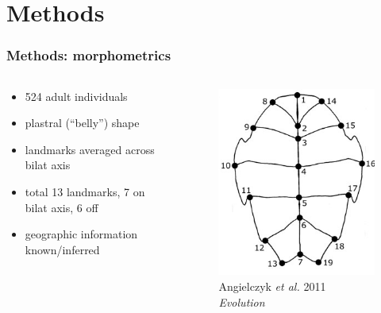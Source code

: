 \documentclass{beamer}\usepackage{graphicx, color}
\begin{document}
\section{Methods}
\begin{frame}
  \frametitle{Methods: morphometrics}
  \begin{columns}
    \begin{column}{0.5\textwidth}
      \begin{itemize}
        \item 524 adult individuals
        \item plastral (``belly'') shape
        \item landmarks averaged across bilat axis
        \item total 13 landmarks, 7 on bilat axis, 6 off
        \item geographic information known/inferred
      \end{itemize}
    \end{column}
    \begin{column}{0.5\textwidth}
      \begin{figure}[h]
        \centering
        \captionsetup{justification = raggedleft, slc = off}
        \includegraphics[width = \textwidth, keepaspectratio = true]{figure/plastra}
        \caption*{\scriptsize{Angielczyk \textit{et al.} 2011 \textit{Evolution}}}
        \label{fig:plast}
      \end{figure}
    \end{column}
  \end{columns}
\end{frame}
\end{document}
